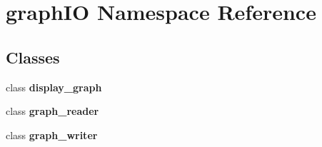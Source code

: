 \section{graph\+IO Namespace Reference}
\label{namespacegraph_i_o}
\subsection*{Classes}
\begin{DoxyCompactItemize}
\item 
class \textbf{ display\+\_\+graph}
\item 
class \textbf{ graph\+\_\+reader}
\item 
class \textbf{ graph\+\_\+writer}
\end{DoxyCompactItemize}
